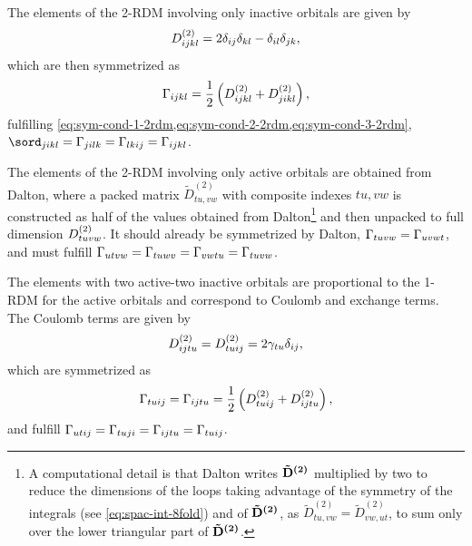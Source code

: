 The elements of the 2-RDM involving only inactive orbitals are given by 
\begin{equation}
    D^{\left( 2 \right)}_{ijkl} = 
    2 \delta_{ij} \delta_{kl} - \delta_{il} \delta_{jk}
    ,
\end{equation}
which are then symmetrized as 
\begin{equation}
    \Gamma_{ijkl} =
    \frac{1}{2} \left( D^{\left( 2 \right)}_{ijkl} + D^{\left( 2 \right)}_{jikl} \right)
    ,
\end{equation}
fulfilling \cref{eq:sym-cond-1-2rdm,eq:sym-cond-2-2rdm,eq:sym-cond-3-2rdm},
$\sord_{jikl} = \sordm_{jilk} = \sordm_{lkij} = \sordm_{ijkl}$.

The elements of the 2-RDM involving only active orbitals are obtained from Dalton,
where a packed matrix $\tilde{D}_{tu,vw}^{(2)}$ with composite indexes $tu,vw$ is
constructed as half of the values obtained from Dalton\footnote{A computational
    detail is that Dalton writes $\boldsymbol{\mathrm{\tilde{D}^{(2)}}}$ multiplied by two to
    reduce the dimensions of the loops taking advantage of the symmetry of the
    integrals (see \cref{eq:spac-int-8fold}) and of $\boldsymbol{\mathrm{\tilde{D}^{(2)}}}$, as 
    $\tilde{D}_{tu,vw}^{(2)} = \tilde{D}_{vw,ut}^{(2)}$,
    to sum only over the lower triangular part of $ \boldsymbol{\mathrm{\tilde{D}^{(2)}}}$.
} and then
unpacked to full dimension $D^{\left( 2 \right)}_{tuvw}$.
It should already be symmetrized by Dalton, $\Gamma_{tuvw} = \Gamma_{uvwt}$, and
must fulfill
$\Gamma_{utvw} = \Gamma_{tuwv} = \Gamma_{vwtu} = \Gamma_{tuvw}$.

The elements with two active-two inactive orbitals are proportional to the
1-RDM for the active orbitals and correspond to Coulomb and exchange terms.
The Coulomb terms are given by
\begin{equation} \label{eq:coulomb-term-2rdm}
    D^{\left( 2 \right)}_{ijtu} = D^{\left( 2 \right)}_{tuij} = 2 \gamma_{tu} \delta_{ij},
\end{equation}
which are symmetrized as 
\begin{equation}
    \Gamma_{tuij} = \Gamma_{ijtu} =
    \frac{1}{2} \left( D^{\left( 2 \right)}_{tuij} + D^{\left( 2 \right)}_{ijtu} \right)
    ,
\end{equation}
and fulfill
$\Gamma_{utij} = \Gamma_{tuji} = \Gamma_{ijtu} = \Gamma_{tuij}$.

